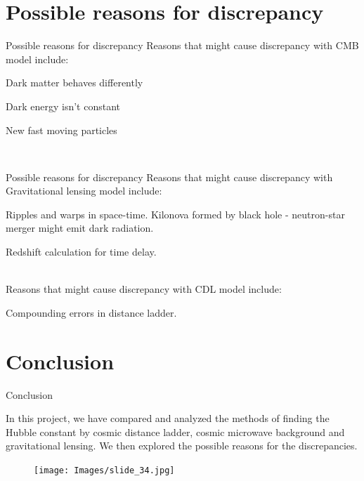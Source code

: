 \documentclass[aspectratio=169]{beamer}                    %
\begin{document}
\section{Possible reasons for discrepancy}
\begin{frame}{Possible reasons for discrepancy }
    \large{Reasons that might cause discrepancy with CMB model include:}
    \begin{vfilleditems}
        \item Dark matter behaves differently
        \item Dark energy isn't constant
        \item New fast moving particles
    \end{vfilleditems}\\[0.5cm]
\end{frame}

\begin{frame}{Possible reasons for discrepancy}
    \large {Reasons that might cause discrepancy with Gravitational lensing model include:}
    \begin{vfilleditems}
        \item Ripples and warps in space-time.
        \iem Kilonova formed by black hole - neutron-star merger might emit dark radiation. 
        \item Redshift calculation for time delay.
    \end{vfilleditems}\\[0.4cm]
    \large {Reasons that might cause discrepancy with CDL model include:}\\
    \begin{vfilleditems}
        \item Compounding errors in distance ladder.
    \end{vfilleditems}
\end{frame}

\section{Conclusion}
\begin{frame}{Conclusion}
    \begin{vfilleditems}
        In this project, we have compared and analyzed the methods of finding the Hubble constant by cosmic distance ladder, cosmic microwave background and gravitational lensing. We then explored the possible reasons for the discrepancies.  
    \end{vfilleditems}


\end{frame}

\begin{frame}{}
    \begin{figure}[htp]
        \centering
        \texttt{[image: Images/slide\_34.jpg]}
    \end{figure}
\end{frame}
\end{document}
